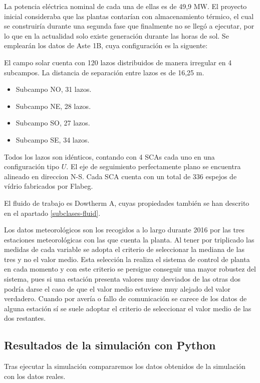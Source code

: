 La potencia eléctrica nominal de cada una de ellas es de 49,9 MW. El proyecto inicial consideraba que las plantas contarían con almacenamiento térmico, el cual se construiría durante una segunda fase que finalmente no se llegó a ejecutar, por lo que en la actualidad solo existe generación durante las horas de sol. Se emplearán los datos de Aste 1B, cuya configuración es la siguente:

El campo solar cuenta con 120 lazos distribuidos de manera irregular en 4 subcampos. La  distancia de separación entre lazos es de 16,25 m. 

\begin{itemize}[itemsep=2pt,parsep=2pt]
\item
  Subcampo NO, 31 lazos.
\item
  Subcampo NE, 28 lazos.
\item
  Subcampo SO, 27 lazos.
\item
  Subcampo SE, 34 lazos.
\end{itemize}

Todos los lazos son idénticos, contando con 4 SCAs cada uno en una configuración tipo \(U\). El eje de seguimiento perfectamente plano se encuentra alineado en direccion N-S. Cada SCA cuenta con un total de 336 espejos de vídrio fabricados por Flabeg.

El fluido de trabajo es Dowtherm A, cuyas propiedades también se han descrito en el apartado \ref{subclases-fluid}.

Los datos meteorológicos son los recogidos a lo largo durante 2016 por las tres estaciones meteorológicas con las que cuenta la planta. Al tener por triplicado las medidas de cada variable se adopta el criterio de seleccionar la mediana de las tres y no el valor medio. Esta selección la realiza el sistema de control de planta en cada momento y con este criterio se persigue conseguir una mayor robustez del sistema, pues si una estación presenta valores muy desviados de las otras dos podría darse el caso de que el valor medio estuviese muy alejado del valor  verdadero. Cuando por avería o fallo de comunicación se carece de los datos de alguna estación sí se suele adoptar el criterio de seleccionar el valor medio de las dos restantes.

\subsection{Resultados de la simulación con Python}

Tras ejecutar la simulación compararemos los datos obtenidos de la simulación con los datos reales. 

 

